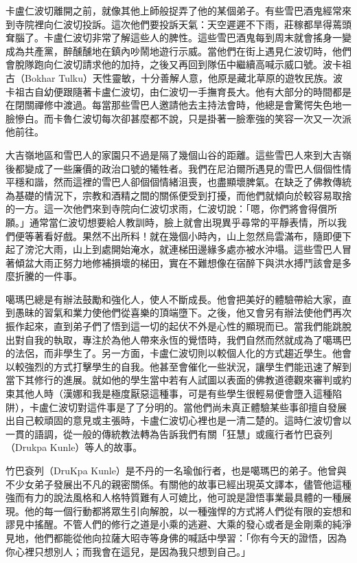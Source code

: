 卡盧仁波切離開之前，就像其他上師般捉弄了他的某個弟子。有些雪巴酒鬼經常來到寺院裡向仁波切投訴。這次他們要投訴天氣：天空遲遲不下雨，莊稼都旱得蔫頭耷腦了。卡盧仁波切非常了解這些人的脾性。這些雪巴酒鬼每到周末就會搖身一變成為共產黨，醉醺醺地在鎮內吵鬧地遊行示威。當他們在街上遇見仁波切時，他們會脫隊跑向仁波切請求他的加持，之後又再回到隊伍中繼續高喊示威口號。波卡祖古（Bokhar
Tulku）天性靈敏，十分善解人意，他原是藏北草原的遊牧民族。波卡祖古自幼便跟隨著卡盧仁波切，由仁波切一手撫育長大。他有大部分的時間都是在閉關禪修中渡過。每當那些雪巴人邀請他去主持法會時，他總是會驚愕失色地一臉慘白。而卡魯仁波切每次卻甚麼都不說，只是掛著一臉牽強的笑容一次又一次派他前往。

大吉嶺地區和雪巴人的家園只不過是隔了幾個山谷的距離。這些雪巴人來到大吉嶺後都變成了一些廉價的政治口號的犧牲者。我們在尼泊爾所遇見的雪巴人個個性情平穩和諧，然而這裡的雪巴人卻個個情緒沮喪，也盡顯壞脾氣。在缺乏了佛教傳統為基礎的情況下，宗教和酒精之間的關係便受到打擾，而他們就傾向於較容易取捨的一方。這一次他們來到寺院向仁波切求雨，仁波切說：「嗯，你們將會得償所願。」通常當仁波切想要給人教訓時，臉上就會出現異乎尋常的平靜表情，所以我們便等著看好戲。果然不出所料！就在幾個小時內，山上忽然烏雲滿布，隨即便下起了滂沱大雨，山上到處開始淹水，就連梯田邊緣多處亦被水沖塌。這些雪巴人冒著傾盆大雨正努力地修補損壞的梯田，實在不難想像在宿醉下與洪水搏鬥該會是多麼折騰的一件事。

噶瑪巴總是有辦法鼓勵和強化人，使人不斷成長。他會把美好的體驗帶給大家，直到愚昧的習氣和業力使他們從喜樂的頂端墮下。之後，他又會另有辦法使他們再次振作起來，直到弟子們了悟到這一切的起伏不外是心性的顯現而已。當我們能跳脫出對自我的執取，專注於為他人帶來永恆的覺悟時，我們自然而然就成為了噶瑪巴的法侶，而非學生了。另一方面，卡盧仁波切則以較個人化的方式趨近學生。他會以較強烈的方式打擊學生的自我。他甚至會催化一些狀況，讓學生們能迅速了解到當下其修行的進展。就如他的學生當中若有人試圖以表面的佛教道德觀來審判或約束其他人時（漢娜和我是極度厭惡這種事，可是有些學生很輕易便會墮入這種陷阱），卡盧仁波切對這件事是了了分明的。當他們尚未真正體驗某些事卻擅自發展出自己較頑固的意見或主張時，卡盧仁波切心裡也是一清二楚的。這時仁波切會以一貫的語調，從一般的傳統教法轉為告訴我們有關「狂慧」或瘋行者竹巴袞列（Drukpa
Kunle）等人的故事。

竹巴袞列（DruKpa
Kunle）是不丹的一名瑜伽行者，也是噶瑪巴的弟子。他曾與不少女弟子發展出不凡的親密關係。有關他的故事已經出現英文譯本，儘管他這種強而有力的說法風格和人格特質難有人可媲比，他可說是證悟事業最具體的一種展現。他的每一個行動都將眾生引向解脫，以一種強悍的方式將人們從有限的妄想和謬見中搖醒。不管人們的修行之道是小乘的逃避、大乘的發心或者是金剛乘的純淨見地，他們都能從他向拉薩大昭寺等身佛的喊話中學習：「你有今天的證悟，因為你心裡只想別人；而我會在這兒，是因為我只想到自己。」

